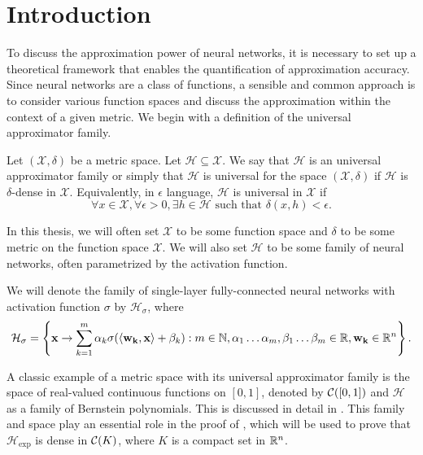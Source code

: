 \section{Introduction}

To discuss the approximation power of neural networks, it is necessary to set up a theoretical framework that enables the quantification of approximation accuracy.
Since neural networks are a class of functions, a sensible and common approach is to consider various function spaces and discuss the approximation within the context of a given metric. We begin with a definition of the universal approximator family.

\begin{definition}
Let $(\mathcal{X}, \delta)$ be a metric space. Let $\mathcal{H} \subseteq \mathcal{X}$. We say that $\mathcal{H}$ is an universal approximator family or simply that $\mathcal{H}$ is universal for the space $(\mathcal{X}, \delta)$ if $\mathcal{H}$ is $\delta$-dense in $\mathcal{X}$. Equivalently, in $\epsilon$ language,  $\mathcal{H}$ is universal in $\mathcal{X}$ if
\[
    \forall x \in \mathcal{X}, \forall \epsilon > 0, \exists h \in \mathcal{H} \text{ such that } \delta(x, h) < \epsilon.
\]
\end{definition}

In this thesis, we will often set $\mathcal{X}$ to be some function space and $\delta$ to be some metric on the function space $\mathcal{X}$.
We will also set $\mathcal{H}$ to be some family of neural networks, often parametrized by the activation function.
\begin{example}
We will denote the family of single-layer fully-connected neural networks with activation function $\sigma$ by $\mathcal{H}_\sigma$, where
\[
\mathcal{H}_{\sigma} = \left \{ \mathbf{x} \to \sum_{k=1}^{m} \alpha_k \sigma{\left (\langle \mathbf{w_k}, \mathbf{x} \rangle + \beta_k \right)} : m \in {\mathbb N}, \alpha_1 \ldots \alpha_m, \beta_1 \ldots \beta_m \in {\mathbb R}, \mathbf{w_k} \in {\mathbb R}^n \right \}. 
\]
\end{example}
\begin{example}
A classic example of a metric space with its universal approximator family is the space of real-valued continuous functions on $[0,1]$, denoted by ${\mathcal C}([0,1])$ and $\mathcal{H}$ as a family of Bernstein polynomials. This is discussed in detail in . This family and space play an essential role in the proof of , which will be used to prove that $\mathcal{H}_{\exp}$ is dense in ${\mathcal C}(K)$, where $K$ is a compact set in ${\mathbb R}^n$.
\end{example}

